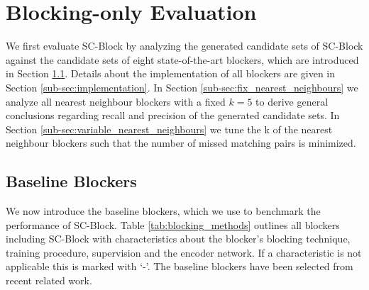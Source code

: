 \documentclass[sigconf,nonacm]{acmart}
\begin{document}
 \section{Blocking-only Evaluation}
\label{sec:evaluation_blocking}
 
We first evaluate SC-Block by analyzing the generated candidate sets of SC-Block against the candidate sets of eight state-of-the-art blockers, which are introduced in Section \ref{sub-sec:baseline_blockers}. Details about the implementation of all blockers are given in Section \ref{sub-sec:implementation}.
In Section \ref{sub-sec:fix_nearest_neighbours} we analyze all nearest neighbour blockers with a fixed $k=5$ to derive general conclusions regarding recall and precision of the generated candidate sets.
In Section \ref{sub-sec:variable_nearest_neighbours} we tune the k of the nearest neighbour blockers such that the number of missed matching pairs is minimized.

\subsection{Baseline Blockers}
\label{sub-sec:baseline_blockers}
We now introduce the baseline blockers, which we use to benchmark the performance of SC-Block.
Table \ref{tab:blocking_methods} outlines all blockers including SC-Block with characteristics about the blocker's blocking technique, training procedure, supervision and the encoder network. If a characteristic is not applicable this is marked with `-'. The baseline blockers have been selected from recent related work.
\end{document}
